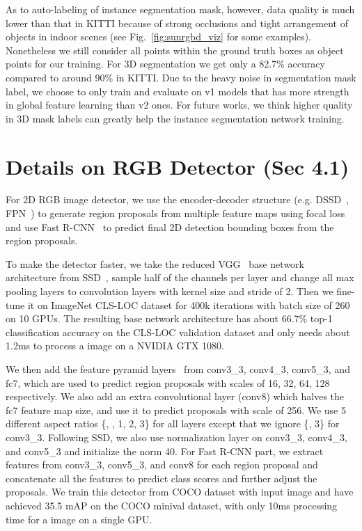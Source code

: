 \documentclass[10pt,twocolumn,letterpaper]{article}
\begin{document}
As to auto-labeling of instance segmentation mask, however, data quality is much lower than that in KITTI because of strong occlusions and tight arrangement of objects in indoor scenes (see Fig.~\ref{fig:sunrgbd_viz} for some examples). Nonetheless we still consider all points within the ground truth boxes as object points for our training. For 3D segmentation we get only a 82.7\% accuracy compared to around 90\% in KITTI. Due to the heavy noise in segmentation mask label, we choose to only train and evaluate on v1 models that has more strength in global feature learning than v2 ones. For future works, we think higher quality in 3D mask labels can greatly help the instance segmentation network training.


\section{Details on RGB Detector (Sec 4.1)}
\label{sec:supp_rgb_detector}

For 2D RGB image detector, we use the encoder-decoder structure (e.g. DSSD~\cite{fu2017dssd}, FPN~\cite{lin2016feature}) to generate region proposals from multiple feature maps using focal loss~\cite{lin2017focal} and use Fast R-CNN~\cite{girshick2015fast} to predict final 2D detection bounding boxes from the region proposals.

To make the detector faster, we take the reduced VGG~\cite{simonyan2014very} base network architecture from SSD~\cite{liu2016ssd}, sample half of the channels per layer and change all max pooling layers to convolution layers with  kernel size and stride of 2. Then we fine-tune it on ImageNet CLS-LOC dataset for 400k iterations with batch size of 260 on 10 GPUs. The resulting base network architecture has about 66.7\% top-1 classification accuracy on the CLS-LOC validation dataset and only needs about 1.2ms to process a  image on a NVIDIA GTX 1080.

We then add the feature pyramid layers~\cite{lin2016feature} from conv3\_3, conv4\_3, conv5\_3, and fc7, which are used to predict region proposals with scales of 16, 32, 64, 128 respectively. We also add an extra convolutional layer (conv8) which halves the fc7 feature map size, and use it to predict proposals with scale of 256. We use 5 different aspect ratios \{, , 1, 2, 3\} for all layers except that we ignore \{, 3\} for conv3\_3. Following SSD, we also use normalization layer on conv3\_3, conv4\_3, and conv5\_3 and initialize the norm 40. For Fast R-CNN part, we extract features from conv3\_3, conv5\_3, and conv8 for each region proposal and concatenate all the features to predict class scores and further adjust the proposals. We train this detector from COCO dataset with  input image and have achieved 35.5 mAP on the COCO minival dataset, with only 10ms processing time for a  image on a single GPU.
\end{document}
